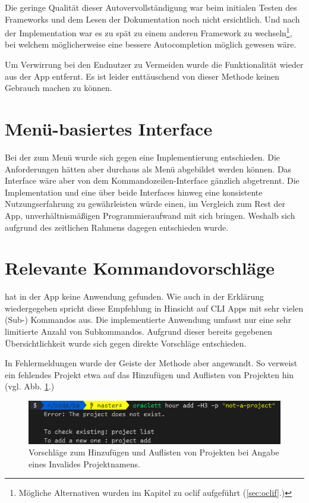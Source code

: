\documentclass[oneside,bibliography=totocnumbered,BCOR=5mm]{scrbook}
\begin{document}
Die geringe Qualität dieser Autovervollständigung war beim initialen Testen
des Frameworks und dem Lesen der Dokumentation noch nicht ersichtlich.
Und nach der Implementation war es zu spät zu einem anderen Framework zu
wechseln\footnote{Mögliche Alternativen wurden im Kapitel zu oclif aufgeführt
(\ref{sec:oclif}.)}, bei welchem möglicherweise eine bessere Autocompletion
möglich gewesen wäre.

Um Verwirrung bei den Endnutzer zu Vermeiden wurde die Funktionalität wieder aus
der App entfernt. Es ist leider enttäuschend von dieser Methode keinen Gebrauch
machen zu können.

\section{Menü-basiertes Interface}
\label{sec:impl-menu}

Bei der  zum Menü wurde sich gegen eine Implementierung
entschieden. Die Anforderungen hätten aber durchaus als Menü abgebildet werden
können. Das Interface wäre aber von dem Kommandozeilen-Interface gänzlich
abgetrennt. Die Implementation und eine über beide Interfaces hinweg eine
konsistente Nutzungserfahrung zu gewährleisten würde einen, im Vergleich zum
Rest der App, unverhältnismäßigen Programmieraufwand mit sich bringen. Weshalb
sich aufgrund des zeitlichen Rahmens dagegen entschieden wurde.

\section{Relevante Kommandovorschläge}

 hat in der App keine Anwendung gefunden. Wie
auch in der Erklärung wiedergegeben spricht \textcite{dutta} diese Empfehlung in
Hinsicht auf CLI Apps mit sehr vielen (Sub-) Kommandos aus. Die implementierte
Anwendung umfasst nur eine sehr limitierte Anzahl von Subkommandos. Aufgrund
dieser bereits gegebenen Übersichtlichkeit wurde sich gegen direkte Vorschläge
entschieden.

In Fehlermeldungen wurde der Geiste der Methode aber angewandt. So verweist ein fehlendes Projekt etwa auf das Hinzufügen und Auflisten von Projekten hin (vgl. Abb. \ref{fig:recommendation-invalid-project}.)

\begin{figure}
  \centering
  \includegraphics[scale=0.5]{recommendation-invalid-project.png}
  \caption{Vorschläge zum Hinzufügen und Auflisten von Projekten bei Angabe eines Invalides Projektnamens.}
  \label{fig:recommendation-invalid-project}
\end{figure}
\end{document}
